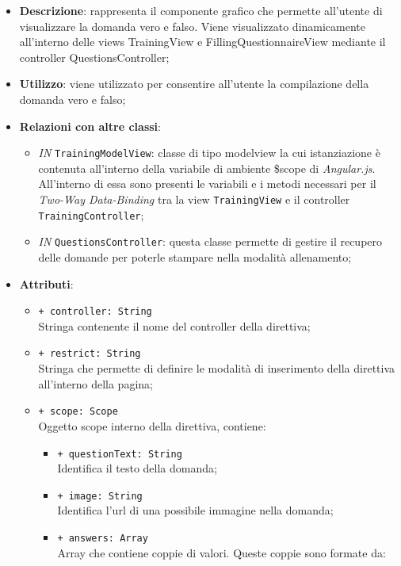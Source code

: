 		\begin{itemize}
			\item \textbf{Descrizione}: rappresenta il componente grafico che permette all'utente di visualizzare la domanda vero e falso. Viene visualizzato dinamicamente all'interno delle views TrainingView e FillingQuestionnaireView mediante il controller QuestionsController;
			\item \textbf{Utilizzo}: viene utilizzato per consentire all'utente la compilazione della domanda vero e falso;
			\item \textbf{Relazioni con altre classi}: 
			\begin{itemize}
				\item \textit{IN} \texttt{TrainingModelView}: classe di tipo modelview la cui istanziazione è contenuta all'interno della variabile di ambiente \$scope di \textit{Angular.js}. All'interno di essa sono presenti le variabili e i metodi necessari per il \textit{Two-Way Data-Binding} tra la view \texttt{TrainingView} e il controller \texttt{TrainingController}; 
				\item \textit{IN} \texttt{QuestionsController}: questa classe permette di gestire il recupero delle domande per poterle stampare nella modalità allenamento;
			\end{itemize}
			\item \textbf{Attributi}: 
			\begin{itemize}
				\item \texttt{+ controller: String} \\ Stringa contenente il nome del controller della direttiva;
				\item \texttt{+ restrict: String} \\ Stringa che permette di definire le modalità di inserimento della direttiva all'interno della pagina;
				\item \texttt{+ scope: Scope} \\ Oggetto scope interno della direttiva, contiene:
				\begin{itemize}
					\item \texttt{+ questionText: String} \\ Identifica il testo della domanda;
					\item \texttt{+ image: String} \\ Identifica l'url di una possibile immagine nella domanda;
					\item \texttt{+ answers: Array} \\ Array che contiene coppie di valori. Queste coppie sono formate da:

\end{itemize}
\end{itemize}
\end{itemize}
